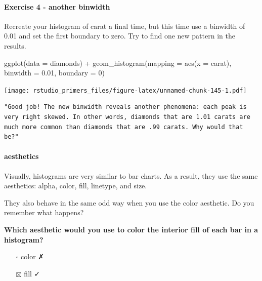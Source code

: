 \documentclass[
]{article}
\newenvironment{Shaded}{\begin{snugshade}}{\end{snugshade}}
\newcommand{\AttributeTok}[1]{\textcolor[rgb]{0.77,0.63,0.00}{#1}}
\newcommand{\DecValTok}[1]{\textcolor[rgb]{0.00,0.00,0.81}{#1}}
\newcommand{\FloatTok}[1]{\textcolor[rgb]{0.00,0.00,0.81}{#1}}
\newcommand{\FunctionTok}[1]{\textcolor[rgb]{0.00,0.00,0.00}{#1}}
\newcommand{\NormalTok}[1]{#1}
\newcommand{\SpecialCharTok}[1]{\textcolor[rgb]{0.00,0.00,0.00}{#1}}
\providecommand{\tightlist}{%
  \setlength{\itemsep}{0pt}\setlength{\parskip}{0pt}}
\begin{document}
\hypertarget{exercise-4---another-binwidth}{%
\paragraph{Exercise 4 - another
binwidth}\label{exercise-4---another-binwidth}}

Recreate your histogram of carat a final time, but this time use a
binwidth of 0.01 and set the first boundary to zero. Try to find one new
pattern in the results.

\begin{Shaded}
\begin{Highlighting}[]
\FunctionTok{ggplot}\NormalTok{(}\AttributeTok{data =}\NormalTok{ diamonds) }\SpecialCharTok{+}
  \FunctionTok{geom\_histogram}\NormalTok{(}\AttributeTok{mapping =} \FunctionTok{aes}\NormalTok{(}\AttributeTok{x =}\NormalTok{ carat), }\AttributeTok{binwidth =} \FloatTok{0.01}\NormalTok{, }\AttributeTok{boundary =} \DecValTok{0}\NormalTok{)}
\end{Highlighting}
\end{Shaded}

\texttt{[image: rstudio\_primers\_files/figure-latex/unnamed-chunk-145-1.pdf]}

\begin{verbatim}
"Good job! The new binwidth reveals another phenomena: each peak is very right skewed. In other words, diamonds that are 1.01 carats are much more common than diamonds that are .99 carats. Why would that be?"
\end{verbatim}

\hypertarget{aesthetics-2}{%
\paragraph{aesthetics}\label{aesthetics-2}}

Visually, histograms are very similar to bar charts. As a result, they
use the same aesthetics: alpha, color, fill, linetype, and size.

They also behave in the same odd way when you use the color aesthetic.
Do you remember what happens?

\textbf{Which aesthetic would you use to color the interior fill of each
bar in a histogram?}

\begin{itemize}
\tightlist
\item[$\square$]
  color ✗
\item[$\boxtimes$]
  fill ✓
\end{itemize}
\end{document}
